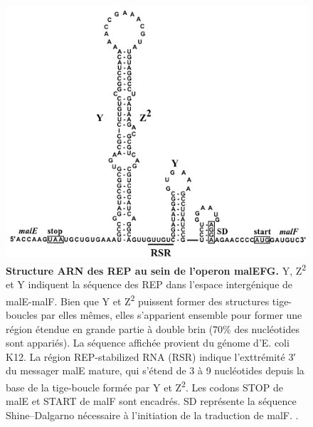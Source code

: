 \documentclass[12pt,a4paper]{report}
\begin{document}
\begin{onehalfspace}
\begin{figure}[ht]
\centerline{\includegraphics[scale=0.5]{figures/malEF_rep.png}}
\caption{\textbf{Structure ARN des REP au sein de l'operon malEFG.} Y, Z\textsuperscript{2} et Y indiquent la séquence des REP dans l'espace intergénique de malE-malF. Bien que Y et Z\textsuperscript{2} puissent former des structures tige-boucles par elles mêmes, elles s'apparient ensemble pour former une région étendue en grande partie à double brin (70\% des nucléotides sont appariés). La séquence affichée provient du génome d'E. coli K12. La région REP-stabilized RNA (RSR) indique l'exttrémité 3′ du messager malE mature, qui s'étend de 3 à 9 nucléotides depuis la base de la tige-boucle formée par Y et Z\textsuperscript{2}. Les codons STOP de  malE et START de malF sont encadrés. SD représente la séquence Shine–Dalgarno nécessaire à l'initiation de la traduction de malF. \citep{Khemici2004}.}\label{fig:malEF_rep} 
\end{figure}



\end{onehalfspace}
\end{document}
